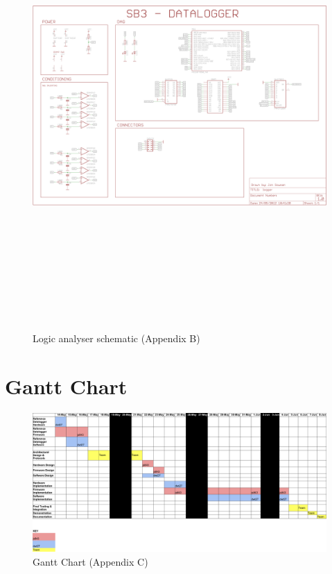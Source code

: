 \documentclass[11pt]{article}
\begin{document}
    \begin{figure}
    \centering
    \includegraphics[height=17cm,angle=90]{../../hardware/schematic.png}
    \caption{Logic analyser schematic (Appendix B)}
    \label{fig:sch}
    \end{figure}

\section{Gantt Chart}
\label{gantt-chart}
			
    \begin{figure}
    \centering
    \includegraphics[width=25cm,angle=90]{gantt.pdf}
    \caption{Gantt Chart (Appendix C)}
    \label{fig:gantt}
    \end{figure}
\end{document}
